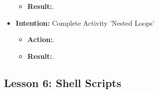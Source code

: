\documentclass{article}
\begin{document}
\begin{itemize}
\begin{itemize}
\item{\textbf{Result:}.}

\end{itemize}

\item{\textbf{Intention:} Complete Activity 'Nested Loops'}

\begin{itemize}
\item{\textbf{Action:}.}

\item{\textbf{Result:}.}

\end{itemize}

\end{itemize}

\subsection{Lesson 6: Shell Scripts}
\end{document}
